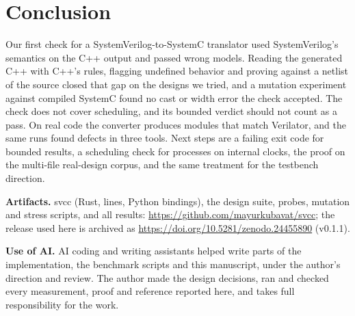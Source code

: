\documentclass[conference]{IEEEtran}
\newcommand{\code}[1]{{\fontshape{n}\ttfamily #1}}
\begin{document}
\section{Conclusion}
\label{sec:conclusion}

Our first check for a SystemVerilog-to-SystemC translator used SystemVerilog's semantics on the
C++ output and passed wrong models. Reading the generated C++ with C++'s rules, flagging undefined
behavior and proving against a netlist of the source closed that gap on the designs we tried, and a
mutation experiment against compiled SystemC found no cast or width error the check accepted. The
check does not cover scheduling, and its bounded verdict should not count as a pass. On real code
the converter produces \nMatch{} modules that match Verilator, and the same runs found defects in
three tools. Next steps are a failing exit code for bounded results, a scheduling check for
processes on internal clocks, the proof on the multi-file real-design corpus, and the same
treatment for the testbench direction.

\textbf{Artifacts.} \code{svcc} (Rust, \nRustLines{} lines, Python bindings), the design suite,
probes, mutation and stress scripts, and all results: \url{https://github.com/mayurkubavat/svcc};
the release used here is archived as \url{https://doi.org/10.5281/zenodo.24455890} (v0.1.1).

\textbf{Use of AI.} AI coding and writing assistants helped write parts of the implementation, the
benchmark scripts and this manuscript, under the author's direction and review. The author made
the design decisions, ran and checked every measurement, proof and reference reported here, and
takes full responsibility for the work.



\end{document}
